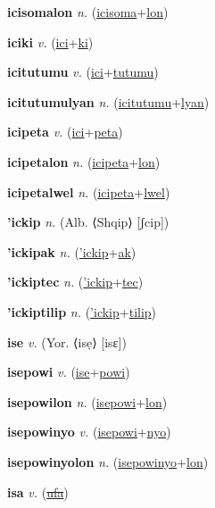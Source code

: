 \textbf{\hypertarget{icisomalon}{icisomalon}} \textit{n.} (\hyperlink{icisoma}{icisoma}+\allowbreak \hyperlink{lon}{lon})


\textbf{\hypertarget{iciki}{iciki}} \textit{v.} (\hyperlink{ici}{ici}+\allowbreak \hyperlink{ki}{ki})


\textbf{\hypertarget{icitutumu}{icitutumu}} \textit{v.} (\hyperlink{ici}{ici}+\allowbreak \hyperlink{tutumu}{tutumu})


\textbf{\hypertarget{icitutumulyan}{icitutumulyan}} \textit{n.} (\hyperlink{icitutumu}{icitutumu}+\allowbreak \hyperlink{lyan}{lyan})


\textbf{\hypertarget{icipeta}{icipeta}} \textit{v.} (\hyperlink{ici}{ici}+\allowbreak \hyperlink{peta}{peta})


\textbf{\hypertarget{icipetalon}{icipetalon}} \textit{n.} (\hyperlink{icipeta}{icipeta}+\allowbreak \hyperlink{lon}{lon})


\textbf{\hypertarget{icipetalwel}{icipetalwel}} \textit{n.} (\hyperlink{icipeta}{icipeta}+\allowbreak \hyperlink{lwel}{lwel})


\textbf{\hypertarget{'ickip}{'ickip}} \textit{n.} (Alb. ⟨Shqip⟩ [ʃcip])


\textbf{\hypertarget{'ickipak}{'ickipak}} \textit{n.} (\hyperlink{'ickip}{'ickip}+\allowbreak \hyperlink{ak}{ak})


\textbf{\hypertarget{'ickiptec}{'ickiptec}} \textit{n.} (\hyperlink{'ickip}{'ickip}+\allowbreak \hyperlink{tec}{tec})


\textbf{\hypertarget{'ickiptilip}{'ickiptilip}} \textit{n.} (\hyperlink{'ickip}{'ickip}+\allowbreak \hyperlink{tilip}{tilip})


\textbf{\hypertarget{ise}{ise}} \textit{v.} (Yor. ⟨isẹ⟩ [isɛ])


\textbf{\hypertarget{isepowi}{isepowi}} \textit{v.} (\hyperlink{ise}{ise}+\allowbreak \hyperlink{powi}{powi})


\textbf{\hypertarget{isepowilon}{isepowilon}} \textit{n.} (\hyperlink{isepowi}{isepowi}+\allowbreak \hyperlink{lon}{lon})


\textbf{\hypertarget{isepowinyo}{isepowinyo}} \textit{v.} (\hyperlink{isepowi}{isepowi}+\allowbreak \hyperlink{nyo}{nyo})


\textbf{\hypertarget{isepowinyolon}{isepowinyolon}} \textit{n.} (\hyperlink{isepowinyo}{isepowinyo}+\allowbreak \hyperlink{lon}{lon})


\textbf{\hypertarget{isa}{isa}} \textit{v.} (\hyperlink{ufa}{\sout{ufa}})


